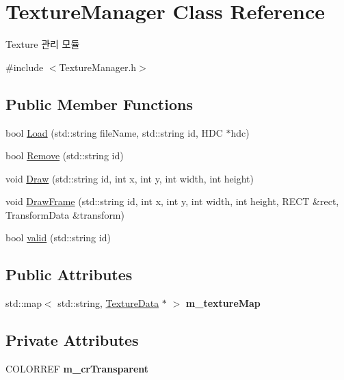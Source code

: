 \hypertarget{class_texture_manager}{}\section{Texture\+Manager Class Reference}
\label{class_texture_manager}


Texture 관리 모듈  




{\ttfamily \#include $<$Texture\+Manager.\+h$>$}

\subsection*{Public Member Functions}
\begin{DoxyCompactItemize}
\item 
bool \mbox{\hyperlink{class_texture_manager_a086c507b246921b4d46d65d05804e463}{Load}} (std\+::string file\+Name, std\+::string id, H\+DC $\ast$hdc)
\item 
bool \mbox{\hyperlink{class_texture_manager_ae40da6381207fdd73f2556164cb64ac7}{Remove}} (std\+::string id)
\item 
void \mbox{\hyperlink{class_texture_manager_ad2d52c0673d95a8958c0800b895279f2}{Draw}} (std\+::string id, int x, int y, int width, int height)
\item 
void \mbox{\hyperlink{class_texture_manager_a153f1fdbc4f953470c289a31058fcfd7}{Draw\+Frame}} (std\+::string id, int x, int y, int width, int height, R\+E\+CT \&rect, Transform\+Data \&transform)
\item 
bool \mbox{\hyperlink{class_texture_manager_aa3f56db961e2415d3dbb7ebe809307f3}{valid}} (std\+::string id)
\end{DoxyCompactItemize}
\subsection*{Public Attributes}
\begin{DoxyCompactItemize}
\item 
\mbox{\label{class_texture_manager_a96ca15b2c412dd637a79e268b0ccdcb6}} 
std\+::map$<$ std\+::string, \mbox{\hyperlink{struct_texture_data}{Texture\+Data}} $\ast$ $>$ {\bfseries m\+\_\+texture\+Map}
\end{DoxyCompactItemize}
\subsection*{Private Attributes}
\begin{DoxyCompactItemize}
\item 
\mbox{\label{class_texture_manager_a956eede5169325a9c85017beb8dce5e6}} 
C\+O\+L\+O\+R\+R\+EF {\bfseries m\+\_\+cr\+Transparent}
\end{DoxyCompactItemize}


